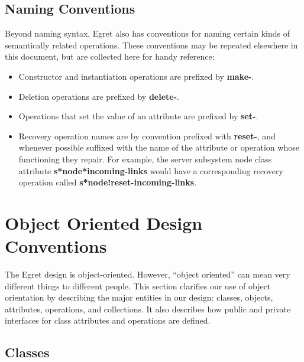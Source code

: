 \subsection{Naming Conventions}

Beyond naming syntax, Egret also has conventions for naming certain
kinds of semantically related operations.  These conventions may be
repeated elsewhere in this document, but are collected here for
handy reference:

\begin{itemize}

\item Constructor and instantiation operations are prefixed by {\bf make-}.

\item Deletion operations are prefixed by {\bf delete-}.

\item Operations that set the value of an attribute are prefixed by {\bf set-}.

\item Recovery operation names are by convention prefixed with {\bf reset-},
and whenever possible suffixed with the name of the attribute or
operation whose functioning they repair.  For example, the server
subsystem node class attribute {\bf s*node*incoming-links}
would have a corresponding recovery operation called {\bf s*node!reset-incoming-links}.

\end{itemize}

\section{Object Oriented Design Conventions}

The Egret design is object-oriented.  However, ``object oriented'' can
mean very different things to different people.  This section
clarifies our use of object orientation by describing the major
entities in our design: classes, objects, attributes, operations, and
collections.  It also describes how public and private interfaces for
class attributes and operations are defined.


\subsection{Classes}  

